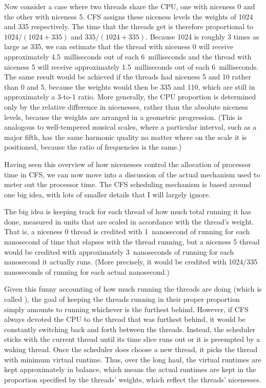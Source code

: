 Now consider a case where two threads share the CPU, one with
niceness 0 and the other with niceness 5.  CFS assigns these niceness
levels the weights of 1024 and 335 respectively.  The time that the
threads get is therefore proportional to $1024/(1024+335)$ and
$335/(1024+335)$.  Because 1024 is roughly 3 times as large as 335, we
can estimate that the thread with niceness 0 will receive
approximately 4.5~milliseconds out of each 6~milliseconds and
the thread with niceness 5 will receive approximately 1.5~milliseconds out of each
6~milliseconds.  The same result would be achieved if
the threads had niceness 5 and 10 rather than 0 and 5, because the
weights would then be 335 and 110, which are still in approximately a
3-to-1 ratio.  More generally, the CPU proportion is determined only
by the relative difference in nicenesses, rather than the absolute
niceness levels, because the weights are arranged in a geometric
progression.  (This is analogous to well-tempered musical scales, where a particular
interval, such as a major fifth, has the same harmonic quality no
matter where on the scale it is positioned, because the ratio of
frequencies is the same.)

Having seen this overview of how nicenesses control the allocation of
processor time in CFS, we can now move into a discussion of the actual
mechanism used to meter out the processor time.
The CFS scheduling mechanism is based around one big idea, with
lots of smaller details that I will largely ignore.

The big idea is
keeping track for each thread of how much total running it has done,
measured in units that are scaled in accordance with the thread's
weight.  That is, a niceness 0 thread is credited with 1~nanosecond of running
for each nanosecond of time that elapses with the thread running, but
a niceness 5 thread would be credited with approximately 3~nanoseconds of
running for each nanosecond it actually runs.  (More precisely, it
would be credited with 1024/335 nanoseconds of running for each
actual nanosecond.)

Given this funny accounting of how much running
the threads are doing (which is called ), the goal of keeping the threads running in
their proper proportion simply amounts to running whichever is the
furthest behind.  However, if CFS always devoted the CPU to the thread that was furthest behind,
it would be constantly switching back and forth between the threads.
Instead, the scheduler sticks with the current thread until its
time slice runs out or it is preempted by a waking thread.
Once the scheduler does choose a new thread, it picks the thread
with minimum virtual runtime.  Thus, over the long haul, the virtual
runtimes are kept approximately in balance, which means the actual
runtimes are kept in the proportion specified by the threads'
weights, which reflect the threads'
nicenesses.

